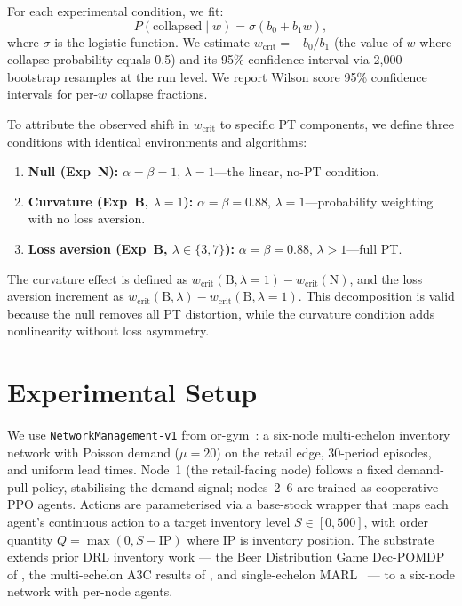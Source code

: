 \documentclass[11pt]{article}
\newcommand{\wcrit}{w_{\mathrm{crit}}}
\begin{document}
For each experimental condition, we fit:
\begin{equation}
  P(\mathrm{collapsed} \mid w) = \sigma(b_0 + b_1 w),
  \label{eq:logistic}
\end{equation}
where $\sigma$ is the logistic function.
We estimate $\wcrit = -b_0/b_1$ (the value of $w$ where collapse
probability equals 0.5) and its 95\% confidence interval via 2,000
bootstrap resamples at the run level.
We report Wilson score 95\% confidence intervals for per-$w$ collapse
fractions.

To attribute the observed shift in $\wcrit$ to specific PT components, we
define three conditions with identical environments and algorithms:
\begin{enumerate}
  \item \textbf{Null (Exp~N):} $\alpha{=}\beta{=}1$, $\lambda{=}1$---the
        linear, no-PT condition.
  \item \textbf{Curvature (Exp~B, $\lambda{=}1$):}
        $\alpha{=}\beta{=}0.88$, $\lambda{=}1$---probability weighting
        with no loss aversion.
  \item \textbf{Loss aversion (Exp~B, $\lambda \in \{3,7\}$):}
        $\alpha{=}\beta{=}0.88$, $\lambda > 1$---full PT.
\end{enumerate}
The curvature effect is defined as
$\wcrit(\text{B},\lambda{=}1) - \wcrit(\text{N})$,
and the loss aversion increment as
$\wcrit(\text{B},\lambda) - \wcrit(\text{B},\lambda{=}1)$.
This decomposition is valid because the null removes all PT distortion,
while the curvature condition adds nonlinearity without loss asymmetry.

\section{Experimental Setup}
\label{sec:setup}

We use \texttt{NetworkManagement-v1} from or-gym~\citep{hubbs2020orgym}:
a six-node multi-echelon inventory network with Poisson demand
($\mu{=}20$) on the retail edge, 30-period episodes, and uniform lead
times.
Node~1 (the retail-facing node) follows a fixed demand-pull policy,
stabilising the demand signal; nodes~2--6 are trained as cooperative PPO
agents.
Actions are parameterised via a base-stock wrapper that maps each
agent's continuous action to a target inventory level $S \in [0, 500]$,
with order quantity $Q = \max(0, S - \mathrm{IP})$ where $\mathrm{IP}$
is inventory position.
The substrate extends prior DRL inventory work --- the Beer Distribution
Game Dec-POMDP of \citet{oroojlooyjadid2022}, the multi-echelon A3C
results of \citet{gijsbrechts2022}, and single-echelon
MARL~\citep{marlim2023} --- to a six-node network with per-node agents.
\end{document}
